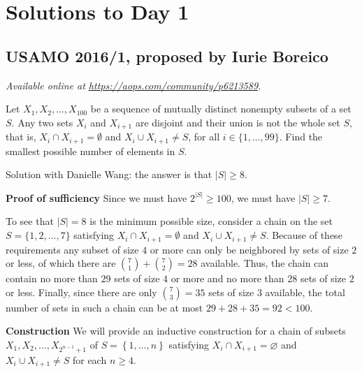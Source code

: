 \documentclass[11pt]{scrartcl}
\begin{document}
\section{Solutions to Day 1}
\subsection{USAMO 2016/1, proposed by Iurie Boreico}
\textsl{Available online at \url{https://aops.com/community/p6213589}.}
\begin{mdframed}[style=mdpurplebox,frametitle={Problem statement}]
Let $X_1, X_2, \dots, X_{100}$ be a sequence of mutually distinct nonempty subsets of a set $S$.
Any two sets $X_i$ and $X_{i+1}$ are disjoint and their
union is not the whole set $S$,
that is, $X_i\cap X_{i+1}=\emptyset$ and $X_i\cup X_{i+1}\neq S$,
for all $i\in\{1, \dots, 99\}$.
Find the smallest possible number of elements in $S$.
\end{mdframed}
Solution with Danielle Wang: the answer is that $|S| \ge 8$.

\textbf{Proof of sufficiency}
Since we must have $2^{|S|} \geq 100$, we must have $|S| \geq 7$.

To see that $|S| = 8$ is the minimum possible size,
consider a chain on the set $S = \{1, 2, \dots, 7\}$
satisfying $X_i \cap X_{i+1} = \emptyset$ and $X_i \cup X_{i+1} \neq S$.
Because of these requirements any subset of size $4$ or more
can only be neighbored by sets of size $2$ or less,
of which there are $\binom 71 + \binom 72 = 28$ available.
Thus, the chain can contain no more than $29$ sets of size $4$ or more
and no more than $28$ sets of size $2$ or less.
Finally, since there are only $\binom 73 = 35$ sets of size $3$ available,
the total number of sets in such a chain
can be at most $29 + 28 + 35 = 92 < 100$.

\textbf{Construction}
We will provide an inductive construction for a
chain of subsets $X_1, X_2, \dots, X_{2^{n-1} + 1}$
of  $S = \left\{ 1, \dots, n \right\}$
satisfying $X_i \cap X_{i+1} = \varnothing$
and $X_i \cup X_{i+1} \neq S$ for each $n \geq 4$.
\end{document}
